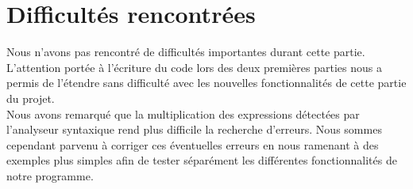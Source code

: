 \documentclass[10pt,a4paper]{article}
\begin{document}
\section{Difficultés rencontrées}
Nous n'avons pas rencontré de difficultés importantes durant cette partie. L'attention portée à l'écriture du code lors des deux premières parties nous a permis de l'étendre sans difficulté avec les nouvelles fonctionnalités de cette partie du projet.\\
Nous avons remarqué que la multiplication des expressions détectées par l'analyseur syntaxique rend plus difficile la recherche d'erreurs. Nous sommes cependant parvenu à corriger ces éventuelles erreurs en nous ramenant à des exemples plus simples afin de tester séparément les différentes fonctionnalités de notre programme.
\end{document}
